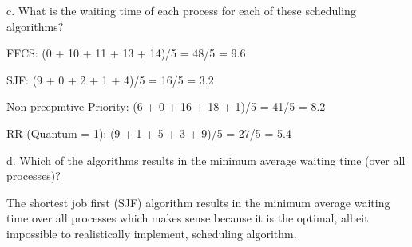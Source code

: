 \documentclass[letterpaper, 10pt,DIV=13]{scrartcl}
\numberwithin{equation}{section} %
\numberwithin{figure}{section} %
\numberwithin{table}{section} %
\begin{document}
\vspace{\baselineskip}
c. What is the waiting time of each process for each of these scheduling algorithms?

FFCS: (0 + 10 + 11 + 13 + 14)/5 = 48/5 = 9.6

SJF: (9 + 0 + 2 + 1 + 4)/5 = 16/5 = 3.2 

Non-preepmtive Priority: (6 + 0 + 16 + 18 + 1)/5 = 41/5 =  8.2

RR (Quantum = 1): (9 + 1 + 5 + 3 + 9)/5 = 27/5 = 5.4  

\vspace{\baselineskip}
d. Which of the algorithms results in the minimum average waiting time (over all processes)?

\hspace{20px}The shortest job first (SJF) algorithm results in the minimum average waiting time over all processes which makes sense because it is the optimal, albeit impossible to realistically implement, scheduling algorithm. 


\end{document}
